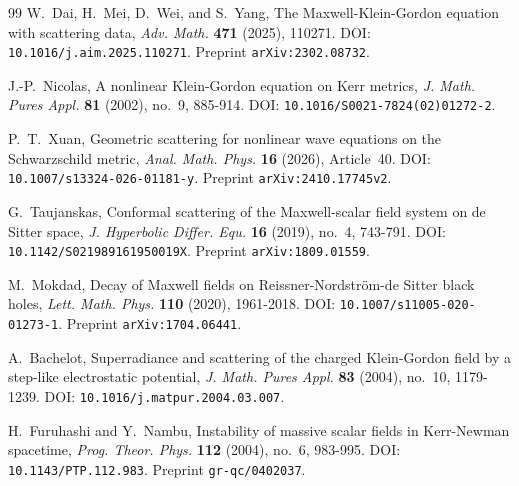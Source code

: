 \documentclass[11pt]{article}
\numberwithin{equation}{section}
\theoremstyle{plain}
\theoremstyle{definition}
\theoremstyle{remark}
\begin{document}
\begin{thebibliography}{99}
W.~Dai, H.~Mei, D.~Wei, and S.~Yang,
\newblock The Maxwell-Klein-Gordon equation with scattering data,
\newblock \emph{Adv. Math.} \textbf{471} (2025), 110271.
\newblock DOI: \texttt{10.1016/j.aim.2025.110271}. Preprint \texttt{arXiv:2302.08732}.

J.-P.~Nicolas,
\newblock A nonlinear Klein-Gordon equation on Kerr metrics,
\newblock \emph{J. Math. Pures Appl.} \textbf{81} (2002), no.~9, 885-914.
\newblock DOI: \texttt{10.1016/S0021-7824(02)01272-2}.

P.~T.~Xuan,
\newblock Geometric scattering for nonlinear wave equations on the Schwarzschild metric,
\newblock \emph{Anal. Math. Phys.} \textbf{16} (2026), Article~40.
\newblock DOI: \texttt{10.1007/s13324-026-01181-y}. Preprint \texttt{arXiv:2410.17745v2}.

G.~Taujanskas,
\newblock Conformal scattering of the Maxwell-scalar field system on de Sitter space,
\newblock \emph{J. Hyperbolic Differ. Equ.} \textbf{16} (2019), no.~4, 743-791.
\newblock DOI: \texttt{10.1142/S021989161950019X}. Preprint \texttt{arXiv:1809.01559}.

M.~Mokdad,
\newblock Decay of Maxwell fields on Reissner-Nordstr\"om-de Sitter black holes,
\newblock \emph{Lett. Math. Phys.} \textbf{110} (2020), 1961-2018.
\newblock DOI: \texttt{10.1007/s11005-020-01273-1}. Preprint \texttt{arXiv:1704.06441}.

A.~Bachelot,
\newblock Superradiance and scattering of the charged Klein-Gordon field by a step-like electrostatic potential,
\newblock \emph{J. Math. Pures Appl.} \textbf{83} (2004), no.~10, 1179-1239.
\newblock DOI: \texttt{10.1016/j.matpur.2004.03.007}.

H.~Furuhashi and Y.~Nambu,
\newblock Instability of massive scalar fields in Kerr-Newman spacetime,
\newblock \emph{Prog. Theor. Phys.} \textbf{112} (2004), no.~6, 983-995.
\newblock DOI: \texttt{10.1143/PTP.112.983}. Preprint \texttt{gr-qc/0402037}.

\end{thebibliography}
\end{document}

